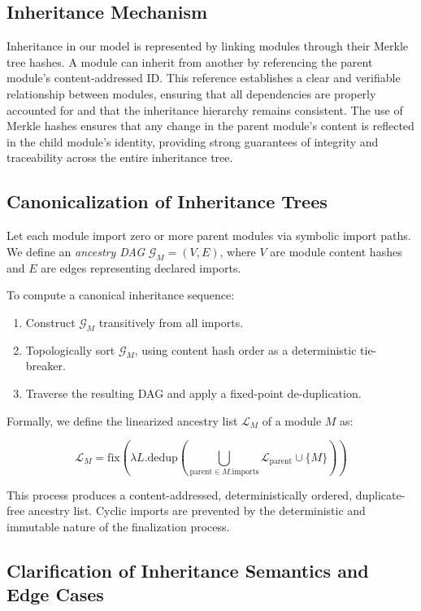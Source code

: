 \documentclass[sigplan,screen]{acmart}
\begin{document}
\subsection{Inheritance Mechanism}
Inheritance in our model is represented by linking modules through their Merkle tree hashes. A module can inherit from another by referencing the parent module's content-addressed ID. This reference establishes a clear and verifiable relationship between modules, ensuring that all dependencies are properly accounted for and that the inheritance hierarchy remains consistent. The use of Merkle hashes ensures that any change in the parent module's content is reflected in the child module's identity, providing strong guarantees of integrity and traceability across the entire inheritance tree.

\subsection{Canonicalization of Inheritance Trees}
\label{sec:canonicalization}

Let each module import zero or more parent modules via symbolic import paths. We define an \textit{ancestry DAG} $\mathcal{G}_M = (V, E)$, where $V$ are module content hashes and $E$ are edges representing declared imports.

To compute a canonical inheritance sequence:

\begin{enumerate}
  \item Construct $\mathcal{G}_M$ transitively from all imports.
  \item Topologically sort $\mathcal{G}_M$, using content hash order as a deterministic tie-breaker.
  \item Traverse the resulting DAG and apply a fixed-point de-duplication.
\end{enumerate}

Formally, we define the linearized ancestry list $\mathcal{L}_M$ of a module $M$ as:

\[
\mathcal{L}_M = \text{fix}(\lambda L. \text{dedup}(\bigcup_{\text{parent} \in M.\text{imports}} \mathcal{L}_{\text{parent}} \cup \{M\}))
\]

This process produces a content-addressed, deterministically ordered, duplicate-free ancestry list. Cyclic imports are prevented by the deterministic and immutable nature of the finalization process.

\subsection{Clarification of Inheritance Semantics and Edge Cases}
\end{document}
